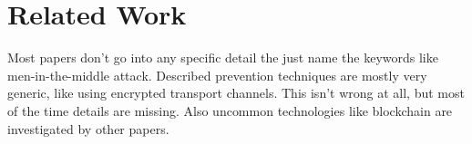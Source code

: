 \section{Related Work}
Most papers don't go into any specific detail the just name the keywords like men-in-the-middle attack. Described prevention techniques are mostly very generic, like using encrypted transport channels. This isn't wrong at all, but most of the time details are missing. Also uncommon technologies like blockchain are investigated by other papers.
